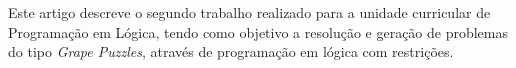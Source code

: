 Este artigo descreve o segundo trabalho realizado para a unidade curricular de Programação em Lógica, tendo como objetivo a resolução e geração de problemas do tipo \textit{Grape Puzzles}, através de programação em lógica com restrições.
